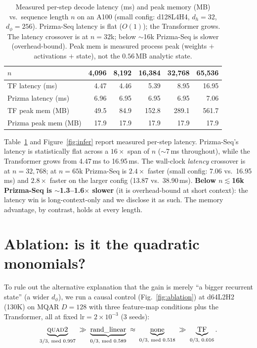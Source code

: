 \documentclass[11pt]{article}
\newcommand{\dphi}{d_{\phi}}
\newcommand{\dhd}{d_{h}}
\newcommand{\quadtwo}{\textsc{quad2}}
\begin{document}
\begin{table}[t]
\centering
\small
\caption{Measured per-step decode latency (ms) and peak memory (MB) vs.\ sequence length $n$ on an
A100 (small config: d128L4H4, $\dhd{=}32$, $\dphi{=}256$). Prizma-Seq latency is flat ($O(1)$); the
Transformer grows. The latency crossover is at $n{=}32$k; below $\sim$16k Prizma-Seq is slower
(overhead-bound). Peak mem is measured process peak (weights $+$ activations $+$ state), not the
$0.56$\,MB analytic state.}
\label{tab:latency}
\begin{tabular}{@{}lrrrrr@{}}
\toprule
$n$ & 4{,}096 & 8{,}192 & 16{,}384 & 32{,}768 & 65{,}536 \\
\midrule
TF latency (ms)        & 4.47 & 4.46 & 5.39 & 8.95 & 16.95 \\
Prizma latency (ms)    & 6.96 & 6.95 & 6.95 & 6.95 & 7.06 \\
\addlinespace[2pt]
TF peak mem (MB)       & 49.5 & 84.9 & 152.8 & 289.1 & 561.7 \\
Prizma peak mem (MB)   & 17.9 & 17.9 & 17.9 & 17.9 & 17.9 \\
\bottomrule
\end{tabular}
\end{table}

Table~\ref{tab:latency} and Figure~\ref{fig:infer} report measured per-step latency. Prizma-Seq's latency is statistically flat
across a $16\times$ span of $n$ ($\sim$7\,ms throughout), while the Transformer grows from 4.47\,ms to
16.95\,ms. The wall-clock \emph{latency} crossover is at $n{=}32{,}768$; at $n{=}65$k Prizma-Seq is
$2.4\times$ faster (small config: 7.06 vs.\ 16.95\,ms) and $2.8\times$ faster on the larger config
(13.87 vs.\ 38.90\,ms). \textbf{Below $n\lesssim$16k Prizma-Seq is $\sim$1.3--1.6$\times$ slower}
(it is overhead-bound at short context): the latency win is long-context-only and we disclose it as
such. The memory advantage, by contrast, holds at every length.

\section{Ablation: is it the quadratic monomials?}
\label{sec:ablation}

To rule out the alternative explanation that the gain is merely ``a bigger recurrent state'' (a wider
$\dphi$), we run a causal control (Fig.~\ref{fig:ablation}) at d64L2H2 (130K) on MQAR $D{=}128$ with three feature-map
conditions plus the Transformer, all at fixed $\text{lr}{=}2\times10^{-3}$ (3 seeds):
\begin{equation*}
\underbrace{\quadtwo}_{\text{3/3, med }0.997} \;\gg\;
\underbrace{\text{rand\_linear}}_{\text{0/3, med }0.589} \;\approx\;
\underbrace{\text{none}}_{\text{0/3, med }0.518} \;\gg\;
\underbrace{\text{TF}}_{\text{0/3, }0.016}.
\end{equation*}
\end{document}
